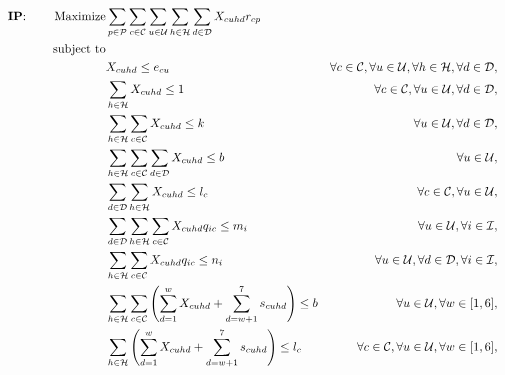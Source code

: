 \documentclass[11pt]{article}
\begin{document}
\begin{align}
\text{\textbf{IP}: \;\;\;\;\;\; }\text{Maximize} & \displaystyle
\sum\limits_{p\in \mathcal{P}}
\sum\limits_{c\in \mathcal{C}}
\sum\limits_{u\in \mathcal{U}}
\sum\limits_{h\in \mathcal{H}}
\sum\limits_{d\in \mathcal{D}}
X_{{c}{u}{h}{d}}  r_{{c}{p}} \label{mathmodel_obj}&
\\
\text{subject to} \notag\\
&X_{{c}{u}{h}{d}} \leq e_{{c}{u}}&\forall c \in \mathcal{C}, \forall u \in \mathcal{U}, \forall h \in \mathcal{H}, \forall d \in \mathcal{D}, \label{mathmodel_eligibility}&\\
&\sum\limits_{h\in\mathcal{H}}X_{{c}{u}{h}{d}} \leq 1 &\forall c \in \mathcal{C}, \forall u \in \mathcal{U}, \forall d \in \mathcal{D}, \label{mathmodel_singlechannel}&\\
&\sum\limits_{h\in\mathcal{H}}\sum\limits_{c\in\mathcal{C}}X_{{c}{u}{h}{d}} \leq k &\forall u \in \mathcal{U}, \forall d \in \mathcal{D}, \label{mathmodel_percustomercommlimit_day}&\\
&\sum\limits_{h\in\mathcal{H}}\sum\limits_{c\in\mathcal{C}}\sum\limits_{d\in\mathcal{D}}X_{{c}{u}{h}{d}} \leq b &\forall u \in \mathcal{U}, \label{mathmodel_percustomercommlimit}&\\
&\sum\limits_{d\in\mathcal{D}}\sum\limits_{h\in\mathcal{H}}X_{{c}{u}{h}{d}} \leq l_{c} &\forall c \in \mathcal{C}, \forall u \in \mathcal{U}, \label{mathmodel_percustomercamplimit}&\\
&\sum\limits_{d\in\mathcal{D}}\sum\limits_{h\in\mathcal{H}}\sum\limits_{c\in\mathcal{C}}X_{{c}{u}{h}{d}}  q_{{i}{c}} \leq m_{i} &\forall u \in \mathcal{U}, \forall i \in \mathcal{I}, \label{mathmodel_weeklyquotalimit}&\\
&\sum\limits_{h\in\mathcal{H}}\sum\limits_{c\in\mathcal{C}}X_{{c}{u}{h}{d}}  q_{{i}{c}} \leq n_{i} &\forall u \in \mathcal{U}, \forall d \in \mathcal{D}, \forall i \in \mathcal{I}, \label{mathmodel_dailyquotalimit}&\\
&\sum\limits_{h\in\mathcal{H}}\sum\limits_{c\in\mathcal{C}}\left(\sum_{d=1}^{w}X_{{c}{u}{h}{d}} + \sum_{d=w+1}^{7}s_{{c}{u}{h}{d}}\right) \leq b &\forall u \in \mathcal{U}, \forall w \in [1,6], \label{mathmodel_percustomercommlimit_rh}&\\
&\sum\limits_{h\in\mathcal{H}}\left( \sum_{d=1}^{w}X_{{c}{u}{h}{d}} + \sum_{d=w+1}^{7}s_{{c}{u}{h}{d}}\right) \leq l_{c} &\forall c \in \mathcal{C}, \forall u \in \mathcal{U}, \forall w \in [1,6], \label{mathmodel_percustomercamplimit_rh}&\\

\end{align}
\end{document}
